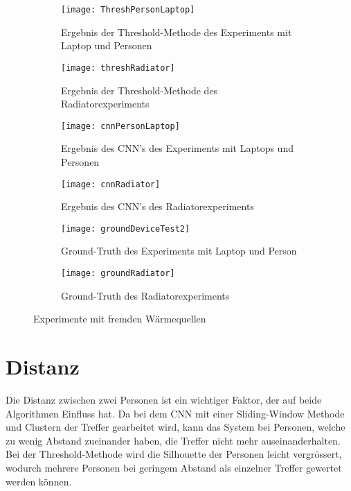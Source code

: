 \vspace{.5em}
\begin{figure}[htb]
	\centering
	\begin{subfigure}{.45\linewidth}
		\centering
		\texttt{[image: ThreshPersonLaptop]}
		\caption{Ergebnis der Threshold-Methode des Experiments mit Laptop und Personen}
		\label{fig:ThreshPersonLaptop}
	\end{subfigure}\hfill%
	\begin{subfigure}{.45\linewidth}
		\centering
		\texttt{[image: threshRadiator]}
		\caption{Ergebnis der Threshold-Methode des Radiatorexperiments}
		\label{fig:thresholdRadiator}
	\end{subfigure}\hfill%
	\begin{subfigure}{.45\linewidth}
		\centering
		\texttt{[image: cnnPersonLaptop]}
		\caption{Ergebnis des CNN's des Experiments mit Laptops und Personen}
		\label{fig:cnnPersonLaptop}
	\end{subfigure}\hfill%
	\begin{subfigure}{.45\linewidth}
		\centering
		\texttt{[image: cnnRadiator]}
		\caption{Ergebnis des CNN's des Radiatorexperiments}
		\label{fig:cnnRadiator}
	\end{subfigure}\hfill%
	\begin{subfigure}{.5\linewidth}
		\centering
		\texttt{[image: groundDeviceTest2]}
		\caption{Ground-Truth des Experiments mit Laptop und Person}
		\label{fig:groundPersonLaptop}
	\end{subfigure}\hfill%
	\begin{subfigure}{.5\linewidth}
		\centering
		\texttt{[image: groundRadiator]}
		\caption{Ground-Truth des Radiatorexperiments}
		\label{fig:groundRadiator}
	\end{subfigure}\hfill%
	\caption{Experimente mit fremden Wärmequellen}
	\label{fig:HeatSources}
\end{figure}
\vspace{.5em}



\section{Distanz}
\label{sec:distanz}

Die Distanz zwischen zwei Personen ist ein wichtiger Faktor, der auf beide Algorithmen Einfluss hat. Da bei dem \gls{CNN} mit einer Sliding-Window Methode und Clustern der Treffer gearbeitet wird, kann das System bei Personen, welche zu wenig Abstand zueinander haben, die Treffer nicht mehr auseinanderhalten. Bei der Threshold-Methode wird die Silhouette der Personen leicht vergrössert, wodurch mehrere Personen bei geringem Abstand als einzelner Treffer gewertet werden können.

